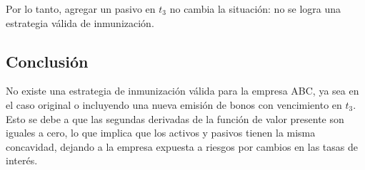 Por lo tanto, agregar un pasivo en \(t_3\) no cambia la situación: no se logra una estrategia válida de inmunización.

\subsection*{Conclusión}
No existe una estrategia de inmunización válida para la empresa ABC, ya sea en el caso original o incluyendo una nueva emisión de bonos con vencimiento en \(t_3\). Esto se debe a que las segundas derivadas de la función de valor presente son iguales a cero, lo que implica que los activos y pasivos tienen la misma concavidad, dejando a la empresa expuesta a riesgos por cambios en las tasas de interés.